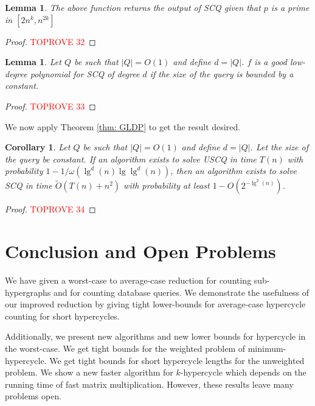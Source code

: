 \documentclass[11pt,letterpaper,pdftex]{article}
\newtheorem{lemma}[theorem]{Lemma}
\newtheorem{corollary}[theorem]{Corollary}
\def\Otil{\tilde{O}}
\begin{document}
\begin{lemma}\label{lem: SCQ polynomial accuracy}
The above function returns the output of SCQ given that $p$ is a prime in $[2n^k, n^{2k}] $
\end{lemma}






\begin{proof}\textcolor{red}{TOPROVE 32}\end{proof}

\begin{lemma}
Let $ Q $ be such that $|Q|= O(1) $ and define $d = |Q|$.
$f$ is a good low-degree polynomial for SCQ of degree $d$ if the size of the query is bounded by a constant. \label{lem:scqGLDP}
\end{lemma}

\begin{proof}\textcolor{red}{TOPROVE 33}\end{proof}

We now apply Theorem \ref{thm: GLDP} to get the result desired.

\begin{corollary}\label{cor: SCQ to USCQ}
Let $ Q $ be such that $|Q|= O(1) $ and define $d = |Q|$. Let the size of the query be constant. If an algorithm exists to solve USCQ in time $T(n)$ with probability $1-1/\omega(\lg^d(n)\lg\lg^d(n) )$, then an algorithm exists to solve SCQ in time $\Otil(T(n) + n^2)$ with probability at least $1-O \left(2^ {-\lg^2(n)}\right)$.
\end{corollary}
\begin{proof}\textcolor{red}{TOPROVE 34}\end{proof}
 
\section{Conclusion and Open Problems}
\label{sec:conc_and_open_prob}
We have given a worst-case to average-case reduction for counting sub-hypergraphs and for counting database queries. We demonstrate the usefulness of our improved reduction by giving tight lower-bounds for average-case hypercycle counting for short hypercycles. 

Additionally, we present new algorithms and new lower bounds for hypercycle in the worst-case. We get tight bounds for the weighted problem of minimum-hypercycle. We get tight bounds for short hypercycle lengths for the unweighted problem. We show a new faster algorithm for $k$-hypercycle which depends on the running time of fast matrix multiplication. However, these results leave many problems open. 
\end{document}
